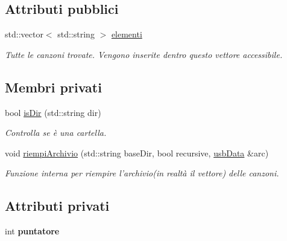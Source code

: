 \subsection*{\-Attributi pubblici}
\begin{DoxyCompactItemize}
\item 
\hypertarget{classusbData_ab0a9963ce896605e7e988e01e6efe1ba}{std\-::vector$<$ std\-::string $>$ \hyperlink{classusbData_ab0a9963ce896605e7e988e01e6efe1ba}{elementi}}\label{classusbData_ab0a9963ce896605e7e988e01e6efe1ba}

\begin{DoxyCompactList}\small\item\em \-Tutte le canzoni trovate. \-Vengono inserite dentro questo vettore accessibile. \end{DoxyCompactList}\end{DoxyCompactItemize}
\subsection*{\-Membri privati}
\begin{DoxyCompactItemize}
\item 
bool \hyperlink{classusbData_a2b695019bdabc6eed11dafaa7c959029}{is\-Dir} (std\-::string dir)
\begin{DoxyCompactList}\small\item\em \-Controlla se è una cartella. \end{DoxyCompactList}\item 
\hypertarget{classusbData_ad2e65d4a17a15b8885ae7d78e12aa2db}{void \hyperlink{classusbData_ad2e65d4a17a15b8885ae7d78e12aa2db}{riempi\-Archivio} (std\-::string base\-Dir, bool recursive, \hyperlink{classusbData}{usb\-Data} \&arc)}\label{classusbData_ad2e65d4a17a15b8885ae7d78e12aa2db}

\begin{DoxyCompactList}\small\item\em \-Funzione interna per riempire l'archivio(in realtà il vettore) delle canzoni. \end{DoxyCompactList}\end{DoxyCompactItemize}
\subsection*{\-Attributi privati}
\begin{DoxyCompactItemize}
\item 
\hypertarget{classusbData_a90134062cfcc6a97e717342f0ac7d4be}{int {\bfseries puntatore}}\label{classusbData_a90134062cfcc6a97e717342f0ac7d4be}

\end{DoxyCompactItemize}


